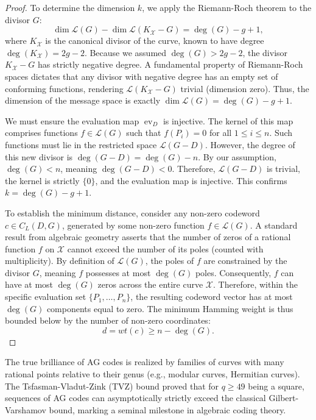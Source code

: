 \begin{proof}
To determine the dimension $k$, we apply the Riemann-Roch theorem to the divisor $G$:
\[
\dim \mathcal{L}(G) - \dim \mathcal{L}(K_{\mathcal{X}} - G) = \deg(G) - g + 1,
\]
where $K_{\mathcal{X}}$ is the canonical divisor of the curve, known to have degree $\deg(K_{\mathcal{X}}) = 2g - 2$. Because we assumed $\deg(G) > 2g - 2$, the divisor $K_{\mathcal{X}} - G$ has strictly negative degree. A fundamental property of Riemann-Roch spaces dictates that any divisor with negative degree has an empty set of conforming functions, rendering $\mathcal{L}(K_{\mathcal{X}} - G)$ trivial (dimension zero). Thus, the dimension of the message space is exactly $\dim \mathcal{L}(G) = \deg(G) - g + 1$.

We must ensure the evaluation map $\operatorname{ev}_D$ is injective. The kernel of this map comprises functions $f \in \mathcal{L}(G)$ such that $f(P_i) = 0$ for all $1 \le i \le n$. Such functions must lie in the restricted space $\mathcal{L}(G - D)$. However, the degree of this new divisor is $\deg(G - D) = \deg(G) - n$. By our assumption, $\deg(G) < n$, meaning $\deg(G - D) < 0$. Therefore, $\mathcal{L}(G - D)$ is trivial, the kernel is strictly $\{0\}$, and the evaluation map is injective. This confirms $k = \deg(G) - g + 1$.

To establish the minimum distance, consider any non-zero codeword $c \in C_L(D, G)$, generated by some non-zero function $f \in \mathcal{L}(G)$. A standard result from algebraic geometry asserts that the number of zeros of a rational function $f$ on $\mathcal{X}$ cannot exceed the number of its poles (counted with multiplicity). By definition of $\mathcal{L}(G)$, the poles of $f$ are constrained by the divisor $G$, meaning $f$ possesses at most $\deg(G)$ poles. Consequently, $f$ can have at most $\deg(G)$ zeros across the entire curve $\mathcal{X}$. Therefore, within the specific evaluation set $\{P_1, \dots, P_n\}$, the resulting codeword vector has at most $\deg(G)$ components equal to zero. The minimum Hamming weight is thus bounded below by the number of non-zero coordinates:
\[
d = wt(c) \ge n - \deg(G).
\]
\end{proof}

The true brilliance of AG codes is realized by families of curves with many rational points relative to their genus (e.g., modular curves, Hermitian curves). The Tsfasman-Vladut-Zink (TVZ) bound proved that for $q \ge 49$ being a square, sequences of AG codes can asymptotically strictly exceed the classical Gilbert-Varshamov bound, marking a seminal milestone in algebraic coding theory.

